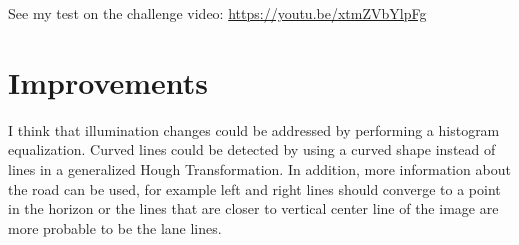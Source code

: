 \documentclass[]{article}
\begin{document}
See my test on the challenge video: \url{https://youtu.be/xtmZVbYlpFg}


\section{Improvements}

I think that illumination changes could be addressed by performing a histogram equalization. Curved lines could be detected by using a curved shape instead of lines in a generalized Hough Transformation. In addition, more information about the road can be used, for example left and right lines should converge to a point in the horizon or the lines that are closer to vertical center line of the image are more probable to be the lane lines.
\end{document}
